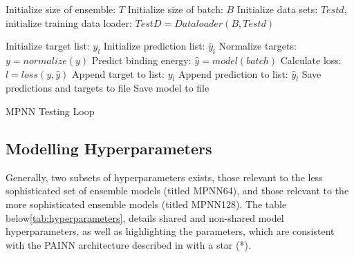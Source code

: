 \begin{algorithm}[H]
    \begin{algorithmic}[2]
        \State Initialize size of ensemble: $T$
        \State Initialize size of batch: $B$
        \State Initialize data sets: $Testd, $
        \State initialize training data loader: $TestD = Dataloader(B,Testd)$

        \State Initialize target list: $y_{l}$
        \State Initialize prediction list: $\hat{y}_{l}$
        \State Normalize targets: $y = normalize(y)$
        \State Predict binding energy: $\hat{y} = model(batch)$
        \State Calculate loss: $l = loss(y,\hat{y})$
        \State Append target to list: $y_{l}$
        \State Append prediction to list: $\hat{y}_{l}$
        \EndFor
        \State Save predictions and targets to file
        \State Save model to file
        \EndFor
    \end{algorithmic}
    \caption{MPNN Testing Loop}
    \label{algo:MPNN_testing}
\end{algorithm}

\subsection{Modelling Hyperparameters}\label{subsec:mod-hyper}

Generally, two subsets of hyperparameters exists, those relevant to the less sophisticated set of ensemble models (titled MPNN64), and those
relevant to the more sophisticated ensemble models (titled MPNN128). The table below\ref{tab:hyperparameters},
details shared and non-shared model hyperparameters, as well
as highlighting the parameters, which are consistent with the PAINN architecture described in \cite{PAINN} with a star (*).

